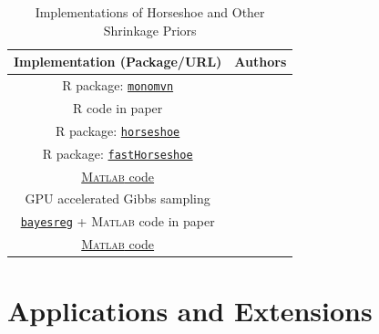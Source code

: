 \documentclass[11pt]{article}
\begin{document}
\begin{table}[htbp]
  \centering
  \caption{Implementations of Horseshoe and Other Shrinkage Priors}
  \footnotesize{
    \begin{tabular}{|c|c|}
    \hline
    Implementation (Package/URL) & Authors \bigstrut\\
    \hline
    \textsc{R} package: \href{https://cran.r-project.org/web/packages/monomvn/index.html}{\texttt{monomvn}} & \citet{gramacy2010shrinkage} \bigstrut[t]\\
     \textsc{R} code in paper & \citet{scott_parameter_2010} \\
    \textsc{R} package: \href{https://cran.r-project.org/web/packages/horseshoe/index.html}{\texttt{horseshoe}} & \citet{pas_horseshoe:_2016} \\
    \textsc{R} package: \href{https://cran.r-project.org/web/packages/fastHorseshoe/index.html}{\texttt{fastHorseshoe}} & \citet{hahn_elliptical_2016} \\
    \href{https://github.com/antik015/Fast-Sampling-of-Gaussian-Posteriors}{\textsc{Matlab} code} & \citet{bhattacharya_fast_2015} \\
    GPU accelerated Gibbs sampling & \citet{terenin_gpu-accelerated_2016} \\
    \href{https://cran.r-project.org/web/packages/bayesreg/index.html}{\texttt{bayesreg}} + \textsc{Matlab} code in paper & \citet{makalic2016high} \\
     \href{https://github.com/jamesjohndrow/horseshoe_jo}{\textsc{Matlab} code} & \citet{james2017scalable} \bigstrut[b]\\ 
    \hline
    \end{tabular}%
    }
  \label{tab:hs-imp}%
\end{table}%




\section{Applications and Extensions}\label{sec:app-ext}

\end{document}
